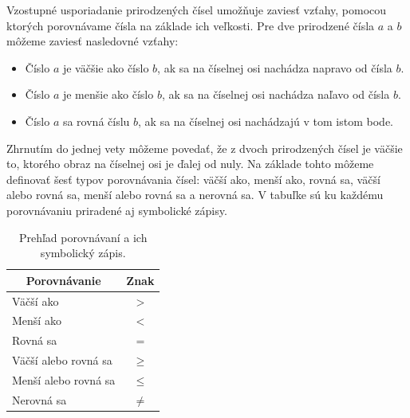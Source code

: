 \documentclass{report}
\begin{document}
Vzostupné usporiadanie prirodzených čísel umožňuje zaviesť vzťahy, pomocou ktorých porovnávame čísla na základe ich veľkosti. Pre dve prirodzené čísla \(a\) a \(b\) môžeme zaviesť nasledovné vzťahy:
\begin{itemize}
  \item Číslo \(a\) je väčšie ako číslo \(b\), ak sa na číselnej osi nachádza napravo od čísla \(b\).
  \item Číslo \(a\) je menšie ako číslo \(b\), ak sa na číselnej osi nachádza naľavo od čísla \(b\).
  \item Číslo \(a\) sa rovná číslu \(b\), ak sa na číselnej osi nachádzajú v tom istom bode.
\end{itemize}
Zhrnutím do jednej vety môžeme povedať, že z dvoch prirodzených čísel je väčšie to, ktorého obraz na číselnej osi je ďalej od nuly. Na základe tohto môžeme definovať šesť typov porovnávania čísel: väčší ako, menší ako, rovná sa, väčší alebo rovná sa, menší alebo rovná sa a nerovná sa. V tabuľke sú ku každému porovnávaniu priradené aj symbolické zápisy.

\begin{table}[H]
  \centering
  \renewcommand{\arraystretch}{1.3}
  \begin{tabular}{|l|c|}
    \hline
    \multicolumn{1}{|c|}{Porovnávanie} &
    \multicolumn{1}{c|}{Znak} \\
    \hline
    Väčší ako & \(>\) \\
    Menší ako & \(<\) \\
    Rovná sa & \(=\) \\
    Väčší alebo rovná sa & \(\geq\) \\
    Menší alebo rovná sa & \(\leq\) \\
    Nerovná sa & \(\neq\) \\
    \hline
  \end{tabular}
  \caption{Prehľad porovnávaní a ich symbolický zápis.}
\end{table}
\end{document}
